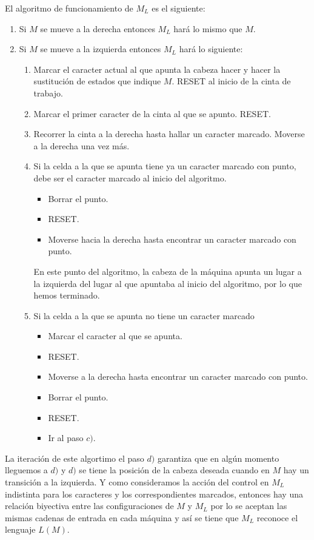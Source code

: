 \documentclass{article}
\begin{document}
El algoritmo de funcionamiento de $M_L$ es el siguiente:
\begin{enumerate}
    \item Si $M$ se mueve a la derecha entonces $M_L$ hará lo mismo que $M$.
    
    \item Si $M$ se mueve a la izquierda entonces $M_L$ hará lo siguiente:
    \begin{enumerate}
        \item Marcar el caracter actual al que apunta la cabeza hacer y hacer la sustitución de estados que indique $M$. RESET al inicio de la cinta de trabajo.
        \item Marcar el primer caracter de la cinta al que se apunto. RESET.
        \item Recorrer la cinta a la derecha hasta hallar un caracter marcado. Moverse a la derecha una vez más.
        \item Si la celda a la que se apunta tiene ya un caracter marcado con punto, debe ser el caracter marcado al inicio del algoritmo.
        \begin{itemize}
            \item Borrar el punto.
            \item RESET.
            \item Moverse hacia la derecha hasta encontrar un caracter marcado con punto.
        \end{itemize}
          En este punto del algoritmo, la cabeza de la máquina apunta un lugar a la izquierda del lugar al que apuntaba al inicio del algoritmo, por lo que hemos terminado. 
        \item Si la celda a la que se apunta no tiene un caracter marcado 
        \begin{itemize}
            \item Marcar el caracter al que se apunta.
            \item RESET.
            \item Moverse a la derecha hasta encontrar un caracter marcado con punto. 
            \item Borrar el punto. 
            \item RESET.
            \item Ir al paso $c)$.
        \end{itemize}
    \end{enumerate}
\end{enumerate}

La iteración de este algortimo el paso $d)$ garantiza que en algún momento lleguemos a $d)$ y $d)$ se tiene la posición de la cabeza deseada cuando en $M$ hay un transición a la izquierda. Y como consideramos la acción del control en $M_L$ indistinta para los caracteres y los correspondientes marcados, entonces hay una relación biyectiva entre las configuraciones de $M$ y $M_L$ por lo se aceptan las mismas cadenas de entrada en cada máquina y así se tiene que $M_L$ reconoce el lenguaje $L(M)$.
\end{document}
